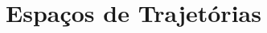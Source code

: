 \documentclass[12pt]{book}
\newtheorem{lema}[teorema]{Lema}
\newcommand{\inteiros}{\mathbb{Z}}
\newcommand{\real}[1]{\mathbb{R}^{#1}}
\newcommand{\lacocontrateis}{\mathcal{L}M}
\begin{document}
\begin{comment}
	\begin{lema}\label{indice_ponto_critico} Sejam $z,y,x \in \lacocontrateis$ então $\mu(y,x) = ind(F_{u})$ é independente de $u \in \mathcal{M}(y,x)$. Além disso
		$$
		\mu(z,y) + \mu(y,x) = \mu(y,x), \; \mu(x,x) = 0.   
		$$
	\end{lema}
	Em Teoria de Morse clássica temos uma função de Morse $f:M\to \real{}$ e seus conjunto de pontos críticos não-degenerados $Crit(f)$, sendo que a cada ponto $x \in Crit(f)$ definimos uma aplicação $m:Crit(f) \to \inteiros$ tal que $m(x)$ é chamado índice de Morse de $x$.	O Lema $\ref{indice_ponto_critico}$ nos dá um candidato a índice dos pontos críticos pois, assim como o índice de Morse, $ind(F_{u}) \in \inteiros$ é um invariante topológico. Por outro lado vimos que $\mu(y,x) = ind(F_{u})$ é uma função que depende do par $(y, x)$ que define a variedade de conexão $\mathcal{M}(y, x)$. Então podemos afirmar que existe uma função $m : \lacocontrateis \to \inteiros$ definida a menos de um inteiro, tal que, dado $u \in \mathcal{M}(y,x)$ o índice do operador será 
	$$
	k = ind(F_{u}) = m(y)-m(x).
	$$
	Note que dessa definição surge uma abiguidade na função que determina o índice de cada ponto $y,x \in \lacocontrateis$ pois podemos escrever $m(y) = k+m(x)$, isto é, para se obter o índide de $y$ devemos ter o índice de $x$, e vice-versa. A seguir vamos definir uma função com as características necessárias para removermos essa ambiguidade. Tal função será chamada de índice de Maslov e a utilizaremos para graduarmos o complexo de cadeia, o que permitirá a construção da Homologia de Floer. 
	
	\end{comment}
	
	\chapter{Espaços de Trajetórias}\label{apendice_variedades_banach}
	
\end{document}
